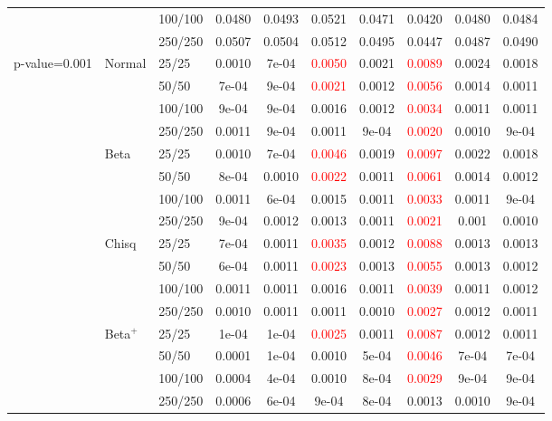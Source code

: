 \documentclass{statsoc}
\begin{document}
\begin{table}
{\begin{tabular}{@{}lllccccccc@{}}
&   &100/100 & 0.0480 &0.0493 &0.0521 &0.0471 &0.0420 &0.0480 &0.0484\\
&   &250/250 &  0.0507 &0.0504 &0.0512 &0.0495 &0.0447 &0.0487 &0.0490\\ \hline
p-value=0.001 &  Normal  & 25/25 & 0.0010 &7e-04 &\textcolor{red}{0.0050} &0.0021 &\textcolor{red}{0.0089} &0.0024 &0.0018\\
& & 50/50 &  7e-04 &9e-04 &\textcolor{red}{0.0021} &0.0012 &\textcolor{red}{0.0056} &0.0014 &0.0011\\
& &  100/100 & 9e-04 &9e-04 &0.0016 &0.0012 &\textcolor{red}{0.0034} &0.0011 &0.0011\\
& &  250/250 &  0.0011 &9e-04 &0.0011 &9e-04 &\textcolor{red}{0.0020} &0.0010 &9e-04\\
&Beta  & 25/25 &  0.0010 &7e-04 &\textcolor{red}{0.0046} &0.0019 &\textcolor{red}{0.0097} &0.0022 &0.0018\\
&   &50/50 &  8e-04 &0.0010 &\textcolor{red}{0.0022} &0.0011 &\textcolor{red}{0.0061} &0.0014 &0.0012\\
&   &100/100 &0.0011 &6e-04 &0.0015 &0.0011 &\textcolor{red}{0.0033} &0.0011 &9e-04\\
&   &250/250 & 9e-04 &0.0012 &0.0013 &0.0011 &\textcolor{red}{0.0021} &0.001 &0.0010\\
&Chisq & 25/25 &  7e-04 &0.0011 &\textcolor{red}{0.0035} &0.0012 &\textcolor{red}{0.0088} &0.0013 &0.0013\\
&   &50/50 & 6e-04 &0.0011 &\textcolor{red}{0.0023} &0.0013 &\textcolor{red}{0.0055} &0.0013 &0.0012\\
&   &100/100 & 0.0011 &0.0011 &0.0016 &0.0011 &\textcolor{red}{0.0039} &0.0011 &0.0012\\
&   &250/250 & 0.0010 &0.0011 &0.0011 &0.0010 &\textcolor{red}{0.0027} &0.0012 &0.0011\\
&Beta$^{+}$ &  25/25 & 1e-04 &1e-04 &\textcolor{red}{0.0025} &0.0011 &\textcolor{red}{0.0087} &0.0012 &0.0011\\
&   &50/50 & 0.0001 &1e-04 &0.0010 &5e-04 &\textcolor{red}{0.0046} &7e-04 &7e-04\\
&   &100/100 & 0.0004 &4e-04 &0.0010 &8e-04 &\textcolor{red}{0.0029} &9e-04 &9e-04\\
&   &250/250 &0.0006 &6e-04 &9e-04 &8e-04 &0.0013 &0.0010 &9e-04\\
     \hline
      \end{tabular}}
\end{table}
\end{document}
